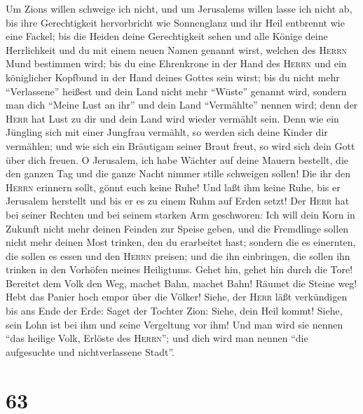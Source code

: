  Um Zions willen schweige ich nicht, und um Jerusalems
willen lasse ich nicht ab, bis ihre Gerechtigkeit hervorbricht wie
Sonnenglanz und ihr Heil entbrennt wie eine Fackel;  bis
die Heiden deine Gerechtigkeit sehen und alle Könige deine Herrlichkeit
und du mit einem neuen Namen genannt wirst, welchen des \textsc{Herrn}
Mund bestimmen wird;  bis du eine Ehrenkrone in der Hand
des \textsc{Herrn} und ein königlicher Kopfbund in der Hand deines
Gottes sein wirst;  bis du nicht mehr ``Verlassene''
heißest und dein Land nicht mehr ``Wüste'' genannt wird, sondern man
dich ``Meine Lust an ihr'' und dein Land ``Vermählte'' nennen wird; denn
der \textsc{Herr} hat Lust zu dir und dein Land wird wieder vermählt
sein.  Denn wie ein Jüngling sich mit einer Jungfrau
vermählt, so werden sich deine Kinder dir vermählen; und wie sich ein
Bräutigam seiner Braut freut, so wird sich dein Gott über dich freuen.
 O Jerusalem, ich habe Wächter auf deine Mauern bestellt,
die den ganzen Tag und die ganze Nacht nimmer stille schweigen sollen!
Die ihr den \textsc{Herrn} erinnern sollt, gönnt euch keine Ruhe!
 Und laßt ihm keine Ruhe, bis er Jerusalem herstellt und
bis er es zu einem Ruhm auf Erden setzt!  Der
\textsc{Herr} hat bei seiner Rechten und bei seinem starken Arm
geschworen: Ich will dein Korn in Zukunft nicht mehr deinen Feinden zur
Speise geben, und die Fremdlinge sollen nicht mehr deinen Most trinken,
den du erarbeitet hast;  sondern die es einernten, die
sollen es essen und den \textsc{Herrn} preisen; und die ihn einbringen,
die sollen ihn trinken in den Vorhöfen meines Heiligtums.
 Gehet hin, gehet hin durch die Tore! Bereitet dem Volk
den Weg, machet Bahn, machet Bahn! Räumet die Steine weg! Hebt das
Panier hoch empor über die Völker!  Siehe, der
\textsc{Herr} läßt verkündigen bis ans Ende der Erde: Saget der Tochter
Zion: Siehe, dein Heil kommt! Siehe, sein Lohn ist bei ihm und seine
Vergeltung vor ihm!  Und man wird sie nennen ``das
heilige Volk, Erlöste des \textsc{Herrn}''; und dich wird man nennen
``die aufgesuchte und nichtverlassene Stadt''.

\hypertarget{section-62}{%
\section{63}\label{section-62}}

